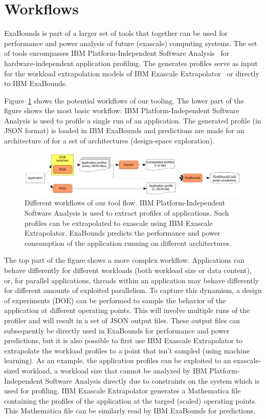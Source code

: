 \section{Workflows}
\label{150:sec:workflows}

ExaBounds is part of a larger set of tools that together can be used for performance and power analysis of future (exascale) computing systems. The set of tools encompasses IBM Platform-Independent Software Analysis~\cite{Anghel2016} for hardware-independent application profiling. The generates profiles serve as input for the workload extrapolation models of IBM Exascale Extrapolator~\cite{Mariani2016} or directly to IBM ExaBounds.

Figure~\ref{fig:150:workflow} shows the potential workflows of our tooling. The lower part of the figure shows the most basic workflow: IBM Platform-Independent Software Analysis is used to profile a single run of an application. The generated profile (in JSON format) is loaded in IBM ExaBounds and predictions are made for an architecture of for a set of architectures (design-space exploration).

\begin{figure}
 \centering
 \includegraphics[width=\columnwidth]{img/workflow.pdf}
 \caption{Different workflows of our tool flow. IBM Platform-Independent Software Analysis is used to extract profiles of applications. Such profiles can be extrapolated to exascale using IBM Exascale Extrapolator. ExaBounds predicts the performance and power consumption of the application running on different architectures.}
 \label{fig:150:workflow}
\end{figure}

The top part of the figure shows a more complex workflow. Applications can behave differently for different workloads (both workload size or data content), or, for parallel applications, threads within an application may behave differently for different amounts of exploited parallelism. To capture this dynamism, a design of experiments (DOE) can be performed to sample the behavior of the application at different operating points. This will involve multiple runs of the profiler and will result in a set of JSON output files. These output files can subsequently be directly used in ExaBounds for performance and power predictions, but it is also possible to first use IBM Exascale Extrapolator to extrapolate the workload profiles to a point that isn't sampled (using machine learning). As an example, the application profiles can be exploited to an exascale-sized workload, a workload size that cannot be analyzed by IBM Platform-Independent Software Analysis directly due to constraints on the system which is used for profiling. IBM Exascale Extrapolator generates a Mathematica file containing the profiles of the application at the targed (scaled) operating points. This Mathematica file can be similarly read by IBM ExaBounds for predictions.


